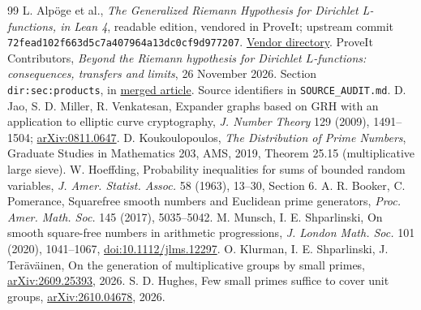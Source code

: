 \documentclass[11pt]{article}
\theoremstyle{remark}\newtheorem{remark}[theorem]{Remark}
\begin{document}
\begin{thebibliography}{99}
 L. Alp\"oge et al., \emph{The Generalized Riemann Hypothesis for Dirichlet L-functions, in Lean 4}, readable edition, vendored in ProveIt; upstream commit \texttt{72fead102f663d5c7a407964a13dc0cf9d977207}. \href{https://github.com/VladimirReshetnikov/ProveIt/tree/main/Analysis/GeneralizedRiemannHypothesis/vendor/grh-lean}{Vendor directory}.
 ProveIt Contributors, \emph{Beyond the Riemann hypothesis for Dirichlet $L$-functions: consequences, transfers and limits}, 26 November 2026. Section \texttt{dir:sec:products}, in \href{https://github.com/VladimirReshetnikov/ProveIt/tree/main/Analysis/GeneralizedRiemannHypothesis/Article}{merged article}. Source identifiers in \texttt{SOURCE\_AUDIT.md}.
 D. Jao, S. D. Miller, R. Venkatesan, Expander graphs based on GRH with an application to elliptic curve cryptography, \emph{J. Number Theory} 129 (2009), 1491--1504; \href{https://arxiv.org/abs/0811.0647}{arXiv:0811.0647}.
 D. Koukoulopoulos, \emph{The Distribution of Prime Numbers}, Graduate Studies in Mathematics 203, AMS, 2019, Theorem 25.15 (multiplicative large sieve).
 W. Hoeffding, Probability inequalities for sums of bounded random variables, \emph{J. Amer. Statist. Assoc.} 58 (1963), 13--30, Section 6.
 A. R. Booker, C. Pomerance, Squarefree smooth numbers and Euclidean prime generators, \emph{Proc. Amer. Math. Soc.} 145 (2017), 5035--5042.
 M. Munsch, I. E. Shparlinski, On smooth square-free numbers in arithmetic progressions, \emph{J. London Math. Soc.} 101 (2020), 1041--1067, \href{https://doi.org/10.1112/jlms.12297}{doi:10.1112/jlms.12297}.
 O. Klurman, I. E. Shparlinski, J. Ter\"av\"ainen, On the generation of multiplicative groups by small primes, \href{https://arxiv.org/abs/2609.25393}{arXiv:2609.25393}, 2026.
 S. D. Hughes, Few small primes suffice to cover unit groups, \href{https://arxiv.org/abs/2610.04678}{arXiv:2610.04678}, 2026.
\end{thebibliography}
\end{document}
